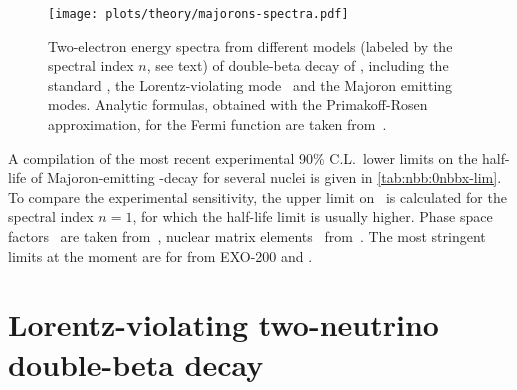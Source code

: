 \begin{figure}
  \centering
  \texttt{[image: plots/theory/majorons-spectra.pdf]}
  \caption{%
    Two-electron energy spectra from different models (labeled by the spectral index $n$,
    see text) of double-beta decay of \gesix, including the standard \nnbb, the
    Lorentz-violating mode \nnbblv\ and the Majoron emitting modes.  Analytic formulas,
    obtained with the Primakoff-Rosen approximation, for the Fermi function are taken
    from~\cite{Tretyak1995, Tretyak2002}.
  }\label{fig:nbb:majorons-spectra}
\end{figure}

A compilation of the most recent experimental 90\% C.L.~lower limits on the half-life of
Majoron-emitting \onbb-decay for several nuclei is given in \cref{tab:nbb:0nbbx-lim}. To
compare the experimental sensitivity, the upper limit on \ga\ is calculated for the spectral
index $n=1$, for which the half-life limit is usually higher. Phase space factors
\psfmajo\ are taken from~\cite{Kotila2015}, nuclear matrix elements \nmemajo\
from~\cite{Engel2017}. The most stringent limits at the moment are for  from
EXO-200 and \kamlandzen.

\begin{table}
  \centering
  \caption{%
    A compilation of the current 90\% C.L.~lower limits on Majoron-emitting \onbb\ modes
    as set by the \gerda, EXO-200, KamLAND-Zen and NEMO-3 experiments for different
    isotopes. The limit on the coupling constant \ga\ for $n=1$ is reported, as calculated
    with phase-space factors from~\cite{Kotila2015} and most up-to-date nuclear matrix
    elements~\cite{Engel2017}. \ga\ limits for the other indices and different models can
    be found in the references. Note that the limits on \ga\ reported here might differ
    from those found in the original publications.
  }\label{tab:nbb:0nbbx-lim}
  
\end{table}

\section{Lorentz-violating two-neutrino double-beta decay}%
\label{sec:nbb:2nbbLV}

